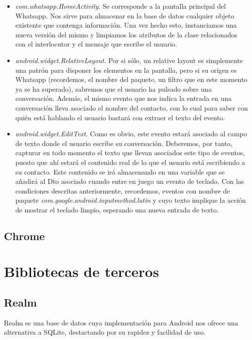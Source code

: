 \documentclass[12pt,a4paper,oneside]{book} %
\begin{document}
\begin{itemize}
\item \textit{com.whatsapp.HomeActivity}. Se corresponde a la pantalla principal del Whatsapp. Nos sirve para almacenar en la base de datos cualquier objeto existente que contenga información. Una vez hecho esto, instanciamos una nueva versión del mismo y limpiamos los atributos de la clase relacionados con el interlocutor y el mensaje que escribe el usuario. 
\item \textit{android.widget.RelativeLayout}. Por si sólo, un relative layout es simplemente una patrón para disponer los elementos en la pantalla, pero si su origen es Whatsapp (recordemos, el nombre del paquete, un filtro que en este momento ya se ha superado), sabremos que el usuario ha pulsado sobre una conversación. 
\newline \newline 
Además, el mismo evento que nos indica la entrada en una conversación lleva asociado el nombre del contacto, con lo cual para saber con quién está hablando el usuario bastará con extraer el texto del evento. 
\item \textit{android.widget.EditText}. Como es obvio, este evento estará asociado al campo de texto donde el usuario escribe su conversación. Deberemos, por tanto, capturar en todo momento el texto que llevan asociados este tipo de eventos, puesto que ahí estará el contenido real de lo que el usuario está escribiendo a su contacto. 
\newline \newline 
Este contenido se irá almacenando en una variable que se añadirá al Dto asociado cuando entre en juego un evento de teclado. Con las condiciones descritas anteriormente, recordemos, eventos con nombre de paquete \textit{com.google.android.inputmethod.latin} y cuyo texto implique la acción de mostrar el teclado limpio, esperando una nueva entrada de texto. 
\end{itemize}
\subsection{Chrome}

\section{Bibliotecas de terceros}
\subsection{Realm}
Realm es una base de datos cuya implementación para Android nos ofrece una alternativa a SQLite, destactando por su rapidez y facilidad de uso. 
\end{document}
